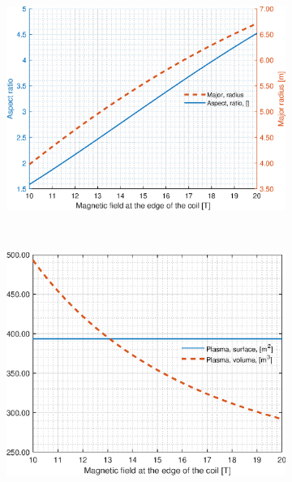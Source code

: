 \begin{figure}[H]
	\begin{subfigure}[b]{.45\textwidth}
		\includegraphics[width=\textwidth]{MatlabFigures/Bmax/f3.eps}
	\end{subfigure}
	~
	\begin{subfigure}[b]{.45\textwidth}
		\includegraphics[width=\textwidth]{MatlabFigures/Bmax/f4.eps}
	\end{subfigure}


\end{figure}
